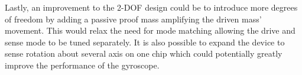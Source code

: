 \documentclass[12pt,a4paper,titlepage]{article}
\begin{document}
\begin{spacing}{1.1}
Lastly, an improvement to the 2-DOF design could be to introduce more degrees of freedom by adding a passive proof mass amplifying the driven mass' movement. This would relax the need for mode matching allowing the drive and sense mode to be tuned separately. It is also possible to expand the device to sense rotation about several axis on one chip which could potentially greatly improve the performance of the gyroscope\cite{An99}.




\end{spacing}
\printbibliography
\end{document}
